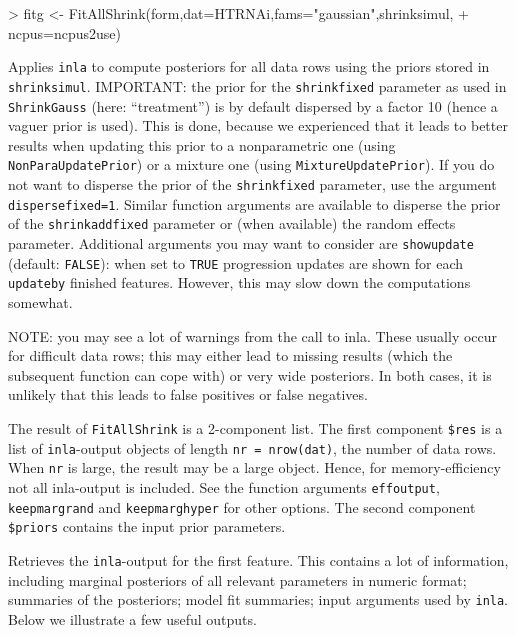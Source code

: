 \documentclass[11pt]{article}
\newcommand{\para}{\bigskip\noindent}
\begin{document}
\para
\begin{Schunk}
\begin{Sinput}
> fitg <- FitAllShrink(form,dat=HTRNAi,fams="gaussian",shrinksimul,
+ ncpus=ncpus2use)
\end{Sinput}
\end{Schunk}
Applies {\tt inla} to compute posteriors for all data rows using the priors stored in {\tt shrinksimul}. IMPORTANT:
the prior for the {\tt shrinkfixed} parameter as used in {\tt ShrinkGauss} (here: ``treatment'') is by default dispersed
by a factor 10 (hence a vaguer prior is used). This is done, because we experienced that it leads to better results when
updating this prior to a nonparametric one (using {\tt NonParaUpdatePrior}) or a mixture one (using {\tt MixtureUpdatePrior}).
If you do not want to disperse the prior of the {\tt shrinkfixed} parameter, use the argument {\tt dispersefixed=1}.
Similar function arguments are available to disperse the prior of the {\tt shrinkaddfixed} parameter or (when available) the random
effects parameter. Additional arguments you may want to consider are {\tt showupdate} (default: {\tt FALSE}): when set to
{\tt TRUE} progression updates are shown for each {\tt updateby} finished features. However, this may slow down
the computations somewhat.

NOTE: you may see a lot of warnings from the call to inla. These usually occur for difficult data rows; this may either lead to
missing results (which the subsequent function can cope with) or very wide posteriors. In both cases, it is unlikely that
this leads to false positives or false negatives.

The result of {\tt FitAllShrink} is a 2-component list.
The first component {\tt \$res} is a list of {\tt inla}-output objects of length {\tt nr = nrow(dat)}, the number of data rows.
When {\tt nr} is large, the result may be a large object. Hence, for memory-efficiency not all inla-output is included.
See the function arguments {\tt effoutput}, {\tt keepmargrand} and {\tt keepmarghyper} for other options. The second component
{\tt \$priors} contains the input prior parameters.


\begin{Schunk}
\end{Schunk}
Retrieves the {\tt inla}-output for the first feature. This contains a lot of information, including
marginal posteriors of all relevant parameters in numeric format; summaries of the posteriors; model fit summaries; input arguments
used by
{\tt inla}. Below we illustrate a few useful outputs.
\end{document}
